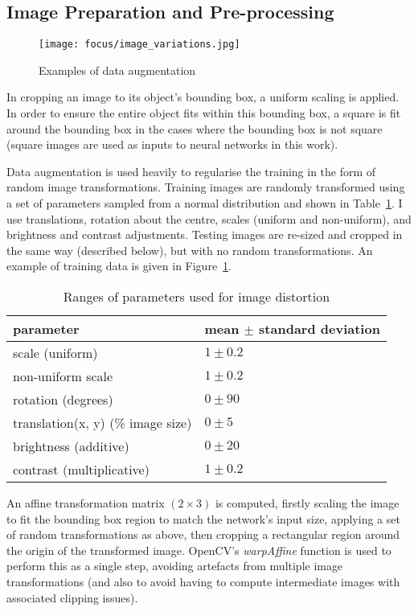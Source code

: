 \subsection {Image Preparation and Pre-processing}

\begin{figure}[t]
\centering
\texttt{[image: focus/image\_variations.jpg]}
\caption{Examples of data augmentation }
\label{fig:focus_variations}
\end{figure}


In cropping an image to its object's bounding box, a uniform scaling is applied. In order to ensure the entire object fits within this bounding box, a square is fit around the bounding box in the cases where the bounding box is not square (square images are used as inputs to neural networks in this work).

Data augmentation is used heavily to regularise the training in the form of random image transformations. Training images are randomly transformed using a set of parameters sampled from a normal distribution and shown in Table~\ref{fig:focus_jitter}.  I use translations, rotation about the centre, scales (uniform and non-uniform), and brightness and contrast adjustments. Testing images are re-sized and cropped in the same way (described below), but with no random transformations. An example of training data is given in Figure~\ref{fig:focus_variations}.

\begin{table}[h]
  \centering
    \caption{Ranges of parameters used for image distortion }
    
  \begin{tabular}{ l  l }
    parameter & mean $ \pm $ standard deviation \\
    \toprule
    scale (uniform) & $ 1 \pm 0.2 $  \\ 
    non-uniform scale  & $ 1 \pm 0.2 $  \\ 
    rotation (degrees) & $ 0 \pm 90 $ \\ 
    translation(x, y) (\% image size) & $ 0 \pm 5 $ \\ 
    brightness (additive) & $ 0 \pm 20 $ \\ 
    contrast (multiplicative) & $ 1 \pm 0.2 $ \\ 
    \bottomrule
  \end{tabular}
\label{fig:focus_jitter}
\end{table}


An affine transformation matrix $ (2 \times 3) $ is computed, firstly scaling the image to fit the bounding box region to match the network's input size, applying a set of random transformations as above, then cropping a rectangular region around the origin of the transformed image. OpenCV's \emph{warpAffine} function is used to perform this as a single step, avoiding artefacts from multiple image transformations (and also to avoid having to compute intermediate images with associated clipping issues).

